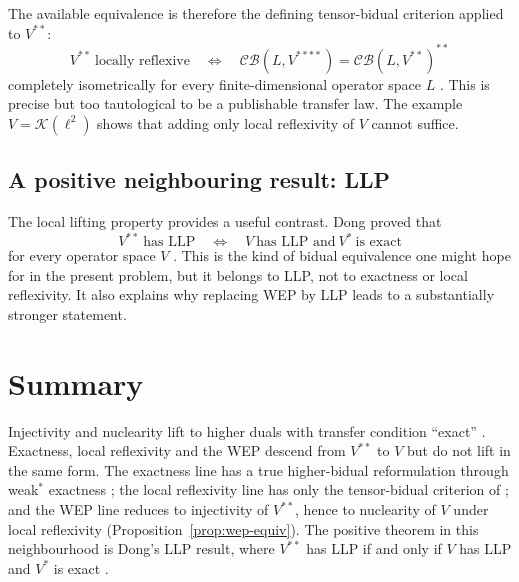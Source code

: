 \documentclass[12pt]{article}
\theoremstyle{definition}
\theoremstyle{remark}
\newcommand{\CB}{\mathcal{CB}}
\newcommand{\K}{\mathcal{K}}
\begin{document}
The available equivalence is therefore the defining tensor-bidual criterion
applied to $V^{**}$:
\[
V^{**}\ \text{locally reflexive}
\quad\Longleftrightarrow\quad
\CB(L,V^{****})=\CB(L,V^{**})^{**}
\]
completely isometrically for every finite-dimensional operator space $L$
\cite[Thm.~14.3.1]{ER00}. This is precise but too tautological to be a
publishable transfer law. The example $V=\K(\ell^2)$ shows that adding only
local reflexivity of $V$ cannot suffice.

\subsection{A positive neighbouring result: LLP}

The local lifting property provides a useful contrast. Dong proved that
\[
        V^{**}\ \text{has LLP}
        \quad\Longleftrightarrow\quad
        V\ \text{has LLP and}\ V^*\ \text{is exact}
\]
for every operator space $V$ \cite{DongLLP}. This is the kind of bidual
equivalence one might hope for in the present problem, but it belongs to LLP,
not to exactness or local reflexivity. It also explains why replacing WEP by
LLP leads to a substantially stronger statement.

\section{Summary}

Injectivity and nuclearity lift to higher duals with transfer condition
``exact'' \cite{DT}. Exactness, local reflexivity and the WEP descend from
$V^{**}$ to $V$ but do not lift in the same form. The exactness line has a
true higher-bidual reformulation through weak$^*$ exactness \cite{DR}; the
local reflexivity line has only the tensor-bidual criterion of
\cite[Thm.~14.3.1]{ER00}; and the WEP line reduces to injectivity of
$V^{**}$, hence to nuclearity of $V$ under local reflexivity
(Proposition~\ref{prop:wep-equiv}). The positive theorem in this neighbourhood is
Dong's LLP result, where
$V^{**}$ has LLP if and only if $V$ has LLP and $V^*$ is exact \cite{DongLLP}.
\end{document}
